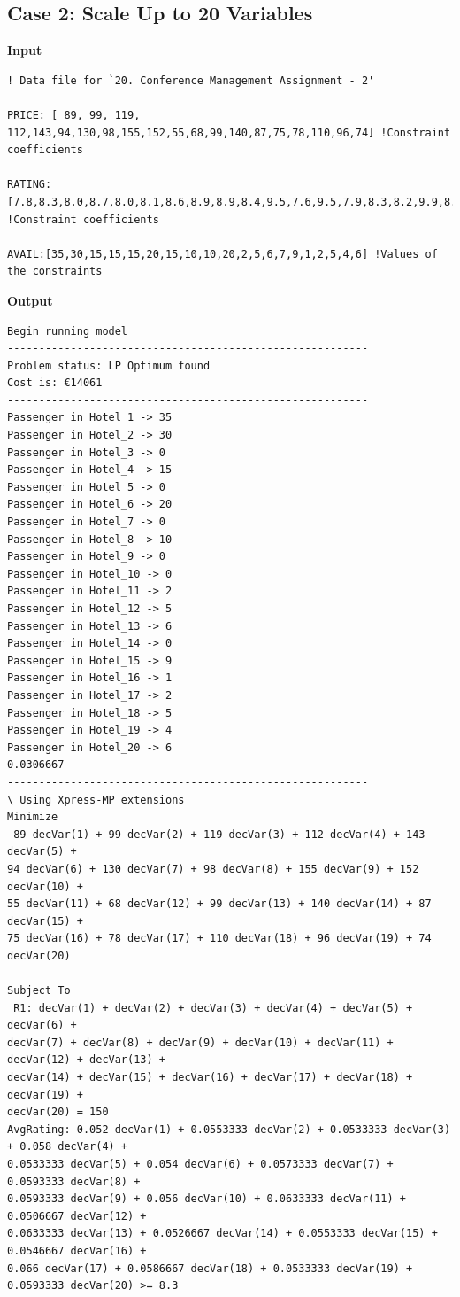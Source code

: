 \documentclass[paper=a4, fontsize=11pt]{scrartcl} %
\begin{document}
\subsection{Case 2: Scale Up to 20 Variables}
\textbf{Input}
\begin{verbatim}
! Data file for `20. Conference Management Assignment - 2'

PRICE: [ 89, 99, 119, 112,143,94,130,98,155,152,55,68,99,140,87,75,78,110,96,74] !Constraint coefficients	 	

RATING: [7.8,8.3,8.0,8.7,8.0,8.1,8.6,8.9,8.9,8.4,9.5,7.6,9.5,7.9,8.3,8.2,9.9,8.8,8.0,8.9] !Constraint coefficients

AVAIL:[35,30,15,15,15,20,15,10,10,20,2,5,6,7,9,1,2,5,4,6] !Values of the constraints
\end{verbatim}
\textbf{Output}
\begin{verbatim}
Begin running model
---------------------------------------------------------
Problem status: LP Optimum found
Cost is: €14061
---------------------------------------------------------
Passenger in Hotel_1 -> 35
Passenger in Hotel_2 -> 30
Passenger in Hotel_3 -> 0
Passenger in Hotel_4 -> 15
Passenger in Hotel_5 -> 0
Passenger in Hotel_6 -> 20
Passenger in Hotel_7 -> 0
Passenger in Hotel_8 -> 10
Passenger in Hotel_9 -> 0
Passenger in Hotel_10 -> 0
Passenger in Hotel_11 -> 2
Passenger in Hotel_12 -> 5
Passenger in Hotel_13 -> 6
Passenger in Hotel_14 -> 0
Passenger in Hotel_15 -> 9
Passenger in Hotel_16 -> 1
Passenger in Hotel_17 -> 2
Passenger in Hotel_18 -> 5
Passenger in Hotel_19 -> 4
Passenger in Hotel_20 -> 6
0.0306667
---------------------------------------------------------
\ Using Xpress-MP extensions
Minimize
 89 decVar(1) + 99 decVar(2) + 119 decVar(3) + 112 decVar(4) + 143 decVar(5) + 
94 decVar(6) + 130 decVar(7) + 98 decVar(8) + 155 decVar(9) + 152 decVar(10) + 
55 decVar(11) + 68 decVar(12) + 99 decVar(13) + 140 decVar(14) + 87 decVar(15) + 
75 decVar(16) + 78 decVar(17) + 110 decVar(18) + 96 decVar(19) + 74 decVar(20)

Subject To
_R1: decVar(1) + decVar(2) + decVar(3) + decVar(4) + decVar(5) + decVar(6) + 
decVar(7) + decVar(8) + decVar(9) + decVar(10) + decVar(11) + decVar(12) + decVar(13) + 
decVar(14) + decVar(15) + decVar(16) + decVar(17) + decVar(18) + decVar(19) + 
decVar(20) = 150
AvgRating: 0.052 decVar(1) + 0.0553333 decVar(2) + 0.0533333 decVar(3) + 0.058 decVar(4) + 
0.0533333 decVar(5) + 0.054 decVar(6) + 0.0573333 decVar(7) + 0.0593333 decVar(8) + 
0.0593333 decVar(9) + 0.056 decVar(10) + 0.0633333 decVar(11) + 0.0506667 decVar(12) + 
0.0633333 decVar(13) + 0.0526667 decVar(14) + 0.0553333 decVar(15) + 0.0546667 decVar(16) + 
0.066 decVar(17) + 0.0586667 decVar(18) + 0.0533333 decVar(19) + 0.0593333 decVar(20) >= 8.3


\end{verbatim}
\end{document}

